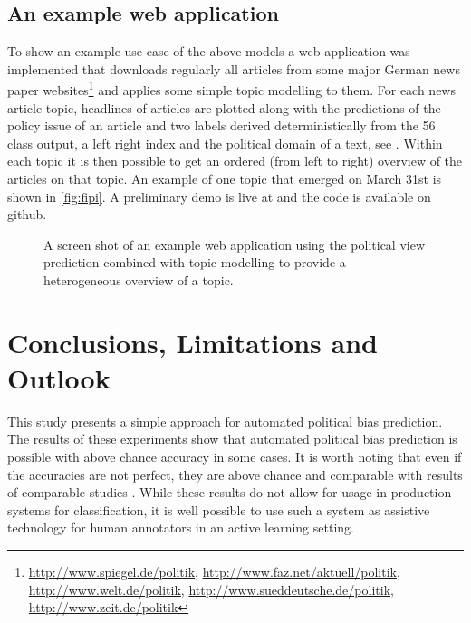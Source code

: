 \documentclass{article}
\begin{document}
\subsection{An example web application}
To show an example use case of the above models a web application was implemented that downloads regularly all articles from some major German news paper websites\footnote{\url{http://www.spiegel.de/politik}, \url{http://www.faz.net/aktuell/politik}, \url{http://www.welt.de/politik}, \url{http://www.sueddeutsche.de/politik}, \url{http://www.zeit.de/politik}} and applies some simple topic modelling to them. For each news article topic, headlines of articles are plotted along with the predictions of the policy issue of an article and two labels derived deterministically from the 56 class output, a left right index and the political domain of a text, see \cite{leftright}. Within each topic it is then possible to get an ordered (from left to right) overview of the articles on that topic. An example of one topic that emerged on March 31st is shown in \autoref{fig:fipi}. A preliminary demo is live at \cite{fipidemo} and the code is available on github\cite{fipi}.
\begin{figure}
\begin{center}
%
\end{center}
\caption{
\label{fig:fipi}
A screen shot of an example web application using the political view prediction combined with topic modelling to provide a heterogeneous overview of a topic. }
\end{figure}


\section{Conclusions, Limitations and Outlook}\label{sec:conclusion}
This study presents a simple approach for automated political bias prediction. The results of these experiments show that automated political bias prediction is possible with above chance accuracy in some cases. It is worth noting that even if the accuracies are not perfect, they are above chance and comparable with results of comparable studies \cite{Yu2008, Hirst2014}. While these results do not allow for usage in production systems for classification, it is well possible to use such a system as assistive technology for human annotators in an active learning setting.
\end{document}
